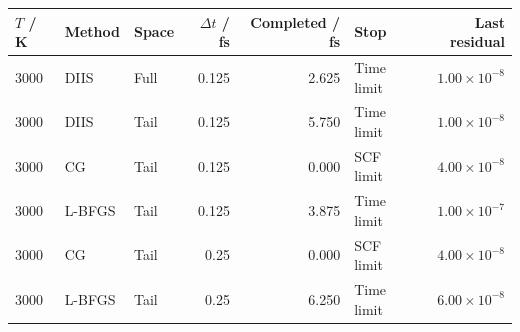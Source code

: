 \begin{tabular}{lllrrlr}\toprule
$T$ / K & Method & Space & $\Delta t$ / fs & Completed / fs & Stop & Last residual\\\midrule
3000 & DIIS & Full & 0.125 & 2.625 & Time limit & $1.00\times10^{-8}$\\
3000 & DIIS & Tail & 0.125 & 5.750 & Time limit & $1.00\times10^{-8}$\\
3000 & CG & Tail & 0.125 & 0.000 & SCF limit & $4.00\times10^{-8}$\\
3000 & L-BFGS & Tail & 0.125 & 3.875 & Time limit & $1.00\times10^{-7}$\\
3000 & CG & Tail & 0.25 & 0.000 & SCF limit & $4.00\times10^{-8}$\\
3000 & L-BFGS & Tail & 0.25 & 6.250 & Time limit & $6.00\times10^{-8}$\\
\bottomrule\end{tabular}
